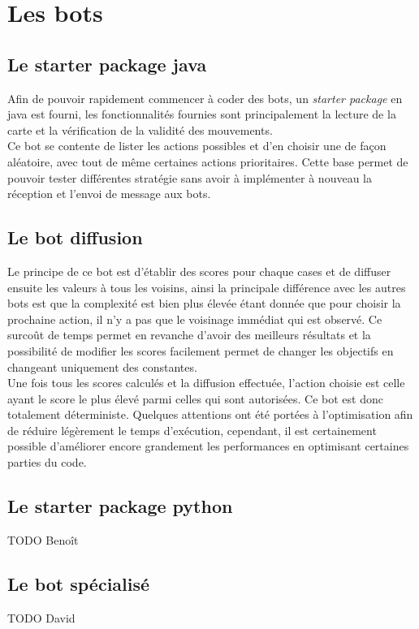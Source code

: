 \documentclass[10pt,a4paper]{report}
\begin{document}
\chapter{Les bots}
\section{Le starter package java}
Afin de pouvoir rapidement commencer à coder des bots, un \emph{starter package}
en java est fourni, les fonctionnalités fournies sont principalement la lecture
de la carte et la vérification de la validité des mouvements.
\\
Ce bot se contente de lister les actions possibles et d'en choisir une de façon
aléatoire, avec tout de même certaines actions prioritaires. Cette base permet
de pouvoir tester différentes stratégie sans avoir à implémenter à nouveau la
réception et l'envoi de message aux bots.

\section{Le bot diffusion}
Le principe de ce bot est d'établir des scores pour chaque cases et de diffuser
ensuite les valeurs à tous les voisins, ainsi la principale différence avec les
autres bots est que la complexité est bien plus élevée étant donnée que pour
choisir la prochaine action, il n'y a pas que le voisinage immédiat qui est
observé. Ce surcoût de temps permet en revanche d'avoir des meilleurs résultats
et la possibilité de modifier les scores facilement permet de changer les
objectifs en changeant uniquement des constantes.
\\
Une fois tous les scores calculés et la diffusion effectuée, l'action choisie
est celle ayant le score le plus élevé parmi celles qui sont autorisées. Ce bot
est donc totalement déterministe. Quelques attentions ont été portées à
l'optimisation afin de réduire légèrement le temps d'exécution, cependant, il
est certainement possible d'améliorer encore grandement les performances en
optimisant certaines parties du code.

\section{Le starter package python}
TODO Benoît

\section{Le bot spécialisé}
TODO David
\end{document}
